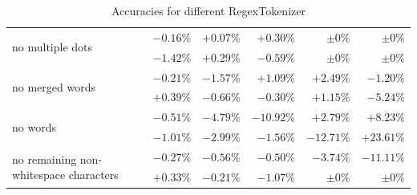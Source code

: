 \documentclass[article,type=msc,colorback,accentcolor=tud7b]{tudthesis}
\begin{document}
\begin{table}[H]
\begin{tabular}{| l | r | r | r | r | r |}
	    \multirow{2}{*}{no multiple dots} & $-0.16\%$ & $+0.07\%$ & $+0.30\%$ & $\pm0\%$ & $\pm0\%$ \\	
	    & $-1.42\%$ & $+0.29\%$ & $-0.59\%$ & $\pm0\%$ & $\pm0\%$ \\ \hline
	    \multirow{2}{*}{no merged words} & $-0.21\%$ & $-1.57\%$ & $+1.09\%$ & $+2.49\%$ & $-1.20\%$ \\	
	    & $+0.39\%$ & $-0.66\%$ & $-0.30\%$ & $+1.15\%$ & $-5.24\%$ \\ \hline
	    \multirow{2}{*}{no words} & $-0.51\%$ & $-4.79\%$ & $-10.92\%$ & $+2.79\%$ & $+8.23\%$ \\	
	    & $-1.01\%$ & $-2.99\%$ & $-1.56\%$ & $-12.71\%$ & $+23.61\%$ \\ \hline
	    \multirow{2}{*}{no remaining non-whitespace characters} & $-0.27\%$ & $-0.56\%$ & $-0.50\%$ & $-3.74\%$ & $-11.11\%$ \\	
	    & $+0.33\%$ & $-0.21\%$ & $-1.07\%$ & $\pm0\%$ & $\pm0\%$ \\ \hline
      \end{tabular}
      \caption{Accuracies for different RegexTokenizer}
      \label{tab:tokenizer_statistics}
	\end{table}
 
\end{document}
